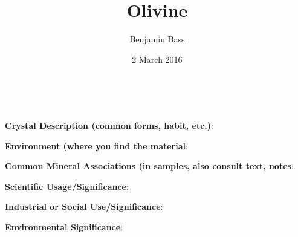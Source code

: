 \documentclass[10pt]{article}
\author{Benjamin Bass}
\date{2 March 2016}
\title{\vspace{-2.0cm}Olivine} %
\begin{document}
\maketitle





\
\
\
\
\
\
\
\
\
\

\begin{framed}
  \textbf{Crystal Description (common forms, habit, etc.)}: 
\end{framed}

\begin{framed}
  \textbf{Environment (where you find the material}: 
\end{framed}

\begin{framed}
  \textbf{Common Mineral Associations (in samples, also consult text, notes}: 
\end{framed}

\begin{framed}
  \textbf{Scientific Usage/Significance}: 
\end{framed}

\begin{framed}
  \textbf{Industrial or Social Use/Significance}: 
\end{framed}

\begin{framed}
  \textbf{Environmental Significance}: 
\end{framed}

\end{document}
